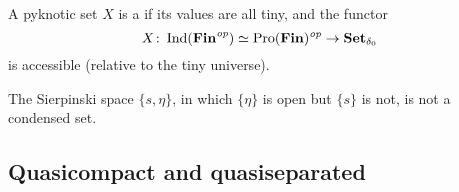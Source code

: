 \begin{dfn}
	A pyknotic set $ X $ is a  if its values are all tiny, and the functor
	\[
		X \colon \operatorname{Ind}(\textbf{\textup{Fin}}^{\textit{op}}) \simeq \operatorname{Pro}(\textbf{\textup{Fin}})^{\textit{op}} \to \textbf{\textup{Set}}_{\delta_0}
	\]
	is accessible (relative to the tiny universe).
\end{dfn}

\begin{exm}
	The Sierpinski space $ \{s, \eta \} $, in which $ \{\eta\} $ is open but $ \{ s \} $ is not, is not a condensed set.
\end{exm}

\subsection{Quasicompact and quasiseparated}




